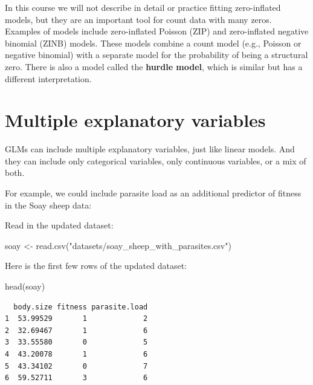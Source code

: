 \documentclass[
  letterpaper,
  8pt,
  a4paper]{book}
\newenvironment{Shaded}{\begin{snugshade}}{\end{snugshade}}
\newcommand{\FunctionTok}[1]{\textcolor[rgb]{0.28,0.35,0.67}{#1}}
\newcommand{\NormalTok}[1]{\textcolor[rgb]{0.00,0.23,0.31}{#1}}
\newcommand{\OtherTok}[1]{\textcolor[rgb]{0.00,0.23,0.31}{#1}}
\newcommand{\StringTok}[1]{\textcolor[rgb]{0.13,0.47,0.30}{#1}}
\begin{document}
In this course we will not describe in detail or practice fitting
zero-inflated models, but they are an important tool for count data with
many zeros. Examples of models include zero-inflated Poisson (ZIP) and
zero-inflated negative binomial (ZINB) models. These models combine a
count model (e.g., Poisson or negative binomial) with a separate model
for the probability of being a structural zero. There is also a model
called the \textbf{hurdle model}, which is similar but has a different
interpretation.

\section*{Multiple explanatory
variables}\label{multiple-explanatory-variables}


GLMs can include multiple explanatory variables, just like linear
models. And they can include only categorical variables, only continuous
variables, or a mix of both.

For example, we could include parasite load as an additional predictor
of fitness in the Soay sheep data:

Read in the updated dataset:

\begin{Shaded}
\begin{Highlighting}[]
\NormalTok{soay }\OtherTok{\textless{}{-}} \FunctionTok{read.csv}\NormalTok{(}\StringTok{"datasets/soay\_sheep\_with\_parasites.csv"}\NormalTok{)}
\end{Highlighting}
\end{Shaded}

Here is the first few rows of the updated dataset:

\begin{Shaded}
\begin{Highlighting}[]
\FunctionTok{head}\NormalTok{(soay)}
\end{Highlighting}
\end{Shaded}

\begin{verbatim}
  body.size fitness parasite.load
1  53.99529       1             2
2  32.69467       1             6
3  33.55580       0             5
4  43.20078       1             6
5  43.34102       0             7
6  59.52711       3             6
\end{verbatim}
\end{document}

